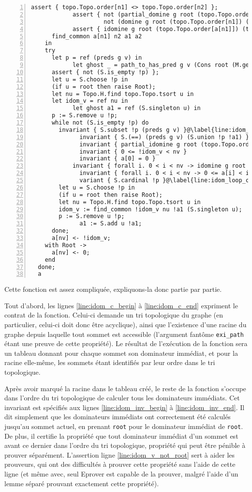 \documentclass[a4paper,10pt]{article}
\begin{document}
\begin{lstlisting}[numbers=left,escapechar=@]
			assert { topo.Topo.order[n1] <> topo.Topo.order[n2] };
			assert { not (partial_domine g root (topo.Topo.order[n1]) v (S.union a1 a2)) by
			         not (domine g root (topo.Topo.order[n1]) (topo.Topo.order[n2])) };
			assert { idomine g root (topo.Topo.order[a[n1]]) (topo.Topo.order[n1]) };
      find_common a[n1] n2 a1 a2
    in
    try
      let p = ref (preds g v) in
			let ghost _ = path_to_has_pred g v (Cons root (M.get exi_path v)) in@\label{line:idom_ghost}@
      assert { not (S.is_empty !p) };
      let u = S.choose !p in
      (if u = root then raise Root);
      let nu = Topo.H.find topo.Topo.tsort u in
      let idom_v = ref nu in
			let ghost a1 = ref (S.singleton u) in
      p := S.remove u !p;
      while not (S.is_empty !p) do
        invariant { S.subset !p (preds g v) }@\label{line:idom_loop_c_begin}@
			  invariant { S.(==) (preds g v) (S.union !p !a1) }
			  invariant { partial_idomine g root (topo.Topo.order[!idom_v]) v !a1 }
			  invariant { 0 <= !idom_v < nv }
			  invariant { a[0] = 0 }
		    invariant { forall i. 0 < i < nv -> idomine g root (topo.Topo.order[a[i]]) (topo.Topo.order[i]) }
			  invariant { forall i. 0 < i < nv -> 0 <= a[i] < i }
			  variant { S.cardinal !p }@\label{line:idom_loop_c_end}@
        let u = S.choose !p in
        (if u = root then raise Root);
        let nu = Topo.H.find topo.Topo.tsort u in
        idom_v := find_common !idom_v nu !a1 (S.singleton u);
        p := S.remove u !p;
			  a1 := S.add u !a1;
      done;
      a[nv] <- !idom_v;
    with Root ->
      a[nv] <- 0;
    end
  done;
  a
\end{lstlisting}

Cette fonction est assez compliquée, expliquons-la donc partie par partie.

Tout d'abord, les lignes \ref{line:idom_c_begin} à \ref{line:idom_c_end} expriment le contrat de la fonction. Celui-ci demande un tri topologique du graphe (en particulier, celui-ci doit donc être acyclique), ainsi que l'existence d'une racine du graphe depuis laquelle tout sommet est accessible (l'argument fantôme \lstinline{exi_path} étant une preuve de cette propriété). Le résultat de l'exécution de la fonction sera un tableau donnant pour chaque sommet son dominateur immédiat, et pour la racine elle-même, les sommets étant identifiés par leur ordre dans le tri topologique.

Après avoir marqué la racine dans le tableau créé, le reste de la fonction s'occupe dans l'ordre du tri topologique de calculer tous les dominateurs immédiats. Cet invariant est spécifiés aux lignes \ref{line:idom_inv_begin} à \ref{line:idom_inv_end}. Il dit simplement que les dominateurs immédiats ont correctement été calculés jusqu'au sommet actuel, en prenant \lstinline{root} pour le dominateur immédiat de \lstinline{root}. De plus, il certifie la propriété que tout dominateur immédiat d'un sommet est avant ce dernier dans l'ordre du tri topologique, propriété qui peut être pénible à prouver séparément. L'assertion ligne \ref{line:idom_v_not_root} sert à aider les prouveurs, qui ont des difficultés à prouver cette propriété sans l'aide de cette ligne (et même avec, seul Eprover est capable de la prouver, malgré l'aide d'un lemme séparé prouvant exactement cette propriété).
\end{document}
